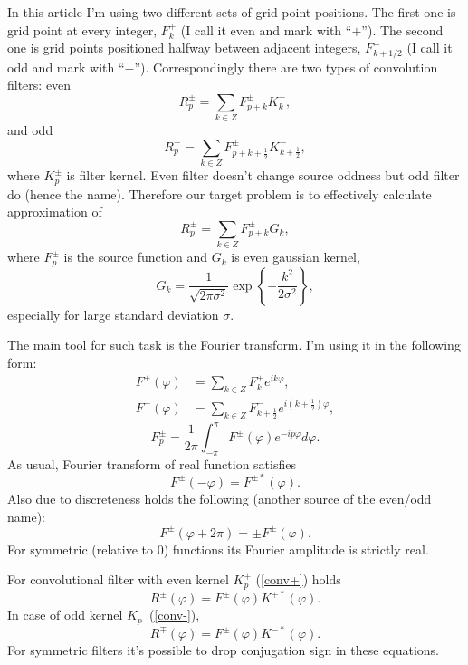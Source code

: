 \documentclass[10pt]{article}
\begin{document}
In this article I'm using two different sets of grid point positions. The first one is grid point at
every integer, $F^+_k$ (I call it even and mark with ``$+$''). The second one is grid points positioned
halfway between adjacent integers, $F^-_{k+1/2}$ (I call it odd and mark with ``$-$'').
Correspondingly there are two types of convolution filters: even
\begin{equation}\label{conv+}
    R^\pm_p = \sum_{k\in Z} F^\pm_{p+k}K^+_k,
\end{equation}
and odd
\begin{equation}\label{conv-}
    R^\mp_p = \sum_{k\in Z} F^\pm_{p+k+\frac12}K^-_{k+\frac12},
\end{equation}
where $K^\pm_p$ is filter kernel. Even filter doesn't change source oddness but odd filter do (hence
the name). Therefore our target problem is to effectively calculate approximation of
\begin{equation}
    R^\pm_p = \sum_{k\in Z} F^\pm_{p+k}G_k,
\end{equation}
where $F^\pm_p$ is the source function and $G_k$ is even gaussian kernel,
\begin{equation}\label{gauss_n}
    G_k = \frac1{\sqrt{2\pi\sigma^2}}\exp\left\{-\frac{k^2}{2\sigma^2}\right\},
\end{equation}
especially for large standard deviation $\sigma$.

The main tool for such task is the Fourier transform. I'm using it in the following form:
\begin{align}
    F^+(\varphi) &= \sum_{k\in Z} F^+_k e^{ik\varphi},\\
    F^-(\varphi) &= \sum_{k\in Z} F^-_{k+\frac12} e^{i(k+\frac12)\varphi},
\end{align}
\begin{equation}
    F^\pm_p = \frac1{2\pi}\int_{-\pi}^\pi F^\pm(\varphi)e^{-ip\varphi}d\varphi.
\end{equation}
As usual, Fourier transform of real function satisfies
\begin{equation}
    F^\pm(-\varphi) = F^{\pm*}(\varphi).
\end{equation}
Also due to discreteness holds the following (another source of the even/odd name):
\begin{equation}
    F^\pm(\varphi+2\pi) = \pm F^\pm(\varphi).
\end{equation}
For symmetric (relative to 0) functions its Fourier amplitude is strictly real.

For convolutional filter with even kernel $K^+_p$ (\ref{conv+}) holds
\begin{equation}
    R^\pm(\varphi) = F^\pm(\varphi)K^{+*}(\varphi).
\end{equation}
In case of odd kernel $K^-_p$ (\ref{conv-}),
\begin{equation}
    R^\mp(\varphi) = F^\pm(\varphi)K^{-*}(\varphi).
\end{equation}
For symmetric filters it's possible to drop conjugation sign in these equations.
\end{document}
